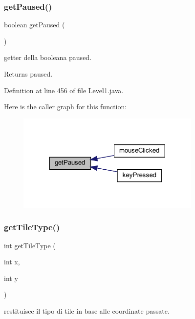 \subsubsection{\texorpdfstring{get\+Paused()}{getPaused()}}
{\footnotesize\ttfamily boolean get\+Paused (\begin{DoxyParamCaption}{ }\end{DoxyParamCaption})}



getter della booleana paused. 

\begin{DoxyReturn}{Returns}
paused. 
\end{DoxyReturn}


Definition at line 456 of file Level1.\+java.

Here is the caller graph for this function\+:\nopagebreak
\begin{figure}[H]
\begin{center}
\leavevmode
\includegraphics[width=257pt]{classscenes_1_1_level1_af5e9f906de91e4d6400bb7f27cd563f3_icgraph}
\end{center}
\end{figure}
\mbox{\label{classscenes_1_1_level1_ac689e72523c8460ac3160526d310b1b7}} 
\subsubsection{\texorpdfstring{get\+Tile\+Type()}{getTileType()}}
{\footnotesize\ttfamily int get\+Tile\+Type (\begin{DoxyParamCaption}\item[{int}]{x,  }\item[{int}]{y }\end{DoxyParamCaption})}



restituisce il tipo di tile in base alle coordinate passate. 


